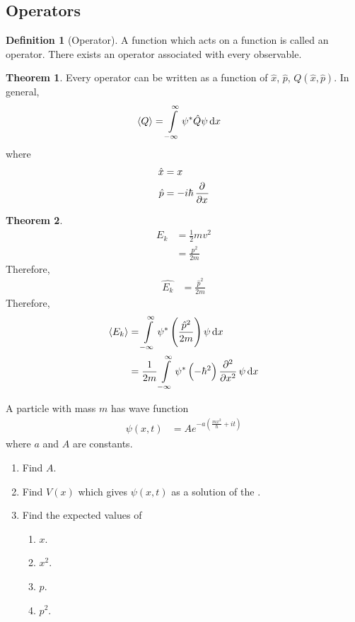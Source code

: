 \documentclass[titlepage, fleqn, a4paper, 12pt, twoside]{article}
\theoremstyle{definition}
\newtheorem{definition}{Definition}
\theoremstyle{theorem}
\newtheorem{theorem}{Theorem}
\begin{document}
\subsection{Operators}

\begin{definition}[Operator]
	A function which acts on a function is called an operator.
	There exists an operator associated with every observable.
\end{definition}

\begin{theorem}
	Every operator can be written as a function of $\hat{x}$, $\hat{p}$, $Q\left( \hat{x},\hat{p} \right)$.
	In general,
	\begin{align*}
		\langle Q \rangle & = \int\limits_{-\infty}^{\infty} \psi^* \hat{Q} \psi \dif x
	\end{align*}
	where
	\begin{align*}
		\hat{x} & = x \\
		\hat{p} & = -i \hbar \dpd{}{x}
	\end{align*}
\end{theorem}

\begin{theorem}
	\begin{align*}
		E_k & = \frac{1}{2} m v^2 \\
                    & = \frac{p^2}{2 m}
	\end{align*}
	Therefore,
	\begin{align*}
		\hat{E_k} & = \frac{\hat{p}^2}{2 m}
	\end{align*}
	Therefore,
	\begin{align*}
		\langle E_k \rangle & = \int\limits_{-\infty}^{\infty} \psi^* \left( \frac{\hat{p}^2}{2 m} \right) \psi \dif x \\
                                    & = \frac{1}{2 m} \int\limits_{-\infty}^{\infty} \psi^* \left( -\hbar^2 \right) \dpd[2]{}{x} \psi \dif x
	\end{align*}
\end{theorem}

\begin{question}
	A particle with mass $m$ has wave function
	\begin{align*}
		\psi(x,t) & = A e^{-a \left( \frac{m x^2}{\hbar} + i t \right)}
	\end{align*}
	where $a$ and $A$ are constants.
	\begin{enumerate}
		\item Find $A$.
		\item Find $V(x)$ which gives $\psi(x,t)$ as a solution of the .
		\item Find the expected values of
			\begin{enumerate}
				\item $x$.
				\item $x^2$.
				\item $p$.
				\item $p^2$.
			\end{enumerate}
	\end{enumerate}
\end{question}
\end{document}
